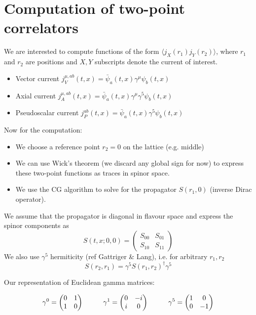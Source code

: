 \documentclass{article}
\begin{document}
\section{Computation of two-point correlators}

We are interested to compute functions of the form $\langle j_X(r_1) j_Y(r_2) \rangle$, 
where $r_1$ and $r_2$ are positions and $X, Y$ subscripts denote the current of interest.

\begin{itemize}
    \item Vector current $j_V^{\mu, ab}(t, x) = \bar\psi_a(t, x) \gamma^\mu \psi_b(t, x)$
    \item Axial current $j_A^{\mu, ab}(t, x) = \bar\psi_a(t, x) \gamma^\mu \gamma^5 \psi_b(t, x)$
    \item Pseudoscalar current $j_P^{ab}(t, x) = \bar\psi_a(t, x) \gamma^5 \psi_b(t, x)$
\end{itemize}

Now for the computation:

\begin{itemize}
    \item We choose a reference point $r_2=0$ on the lattice (e.g. middle)
    \item We can use Wick's theorem (we discard any global sign for now) to express these two-point functions as traces in spinor space.
    \item We use the CG algorithm to solve for the propagator $S(r_1, 0)$ (inverse Dirac operator). 
\end{itemize}

We assume that the propagator is diagonal in flavour space and express the spinor components as 
\begin{equation}
    S(t, x; 0, 0) = \begin{pmatrix} S_{00} & S_{01} \\ S_{10} & S_{11} \end{pmatrix}    
\end{equation}
We also use $\gamma^5$ hermiticity (ref Gattriger \& Lang), i.e. for arbitrary $r_1, r_2$ 
\begin{equation}
    S(r_2, r_1) = \gamma^5 S(r_1, r_2)^\dagger \gamma^5
\end{equation}

Our representation of Euclidean gamma matrices:

\begin{equation}
    \gamma^0 = \begin{pmatrix} 0 & 1 \\ 1 & 0 \end{pmatrix} \hspace{10mm}
    \gamma^1 = \begin{pmatrix} 0 & -i \\ i & 0 \end{pmatrix} \hspace{10mm}
    \gamma^5 = \begin{pmatrix} 1 & 0 \\ 0 & -1 \end{pmatrix}
\end{equation}
\end{document}
